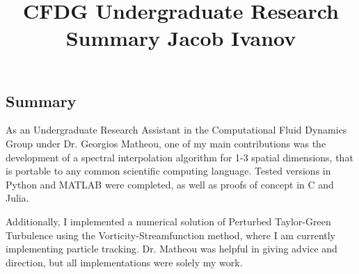 \documentclass[10pt, reqno]{amsart}
\begin{document}
\title{CFDG Undergraduate Research Summary \quad Jacob Ivanov}

\maketitle

\begin{multicols}{2}
\vspace{-.1 in}
\section{Summary}
As an Undergraduate Research Assistant in the Computational Fluid Dynamics Group under Dr. Georgios Matheou, one of my main contributions was the development of a spectral interpolation algorithm for 1-3 spatial dimensions, that is portable to any common scientific computing language. Tested versions in Python and MATLAB were completed, as well as proofs of concept in C and Julia. 

Additionally, I implemented a numerical solution of Perturbed Taylor-Green Turbulence using the Vorticity-Streamfunction method, where I am currently implementing particle tracking. Dr. Matheou was helpful in giving advice and direction, but all implementations were solely my work. 
\vspace{-.05 in}

\end{multicols}
\end{document}

